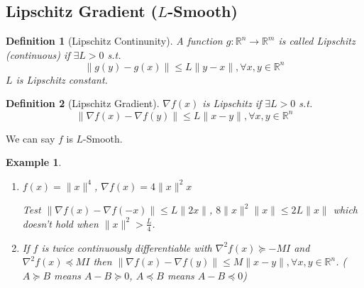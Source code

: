 \documentclass[11pt,a4paper]{article}
\newtheorem{example}{Example}
\newtheorem{definition}{Definition}
\begin{document}
\subsection{Lipschitz Gradient ($L$-Smooth)}
\begin{definition}[Lipschitz Continunity]
A function $g: \mathbb{R}^n \rightarrow	\mathbb{R}^m$ is called Lipschitz (continuous) if $\exists L>0$ s.t.
$$\|g(y)-g(x)\|\leq L\|y-x\|,\forall x,y\in \mathbb{R}^n$$
$L$ is Lipschitz constant.
\end{definition}

\begin{definition}[Lipschitz Gradient]
    $\nabla f(x)$ is Lipschitz if $\exists L>0$ s.t. $$\|\nabla f(x)-\nabla f(y)\|\leq L\|x-y\|,\forall x,y\in \mathbb{R}^n$$
\end{definition}
We can say $f$ is $L$-Smooth.

\begin{example}
    \quad

\begin{enumerate}
    \item $f(x)=\|x\|^4$, $\nabla f(x)=4\|x\|^2x$
    
    Test $\|\nabla f(x)-\nabla f(-x)\|\leq L\|2x\|$, $8\|x\|^2\|x\|\leq 2L\|x\|$ which doesn't hold when $\|x\|^2>\frac{L}{4}$.
    \item If $f$ is twice continuously differentiable with $\nabla^2 f(x)\succeq -MI$ and $\nabla^2 f(x)\preceq  MI$ then $\|\nabla f(x)-\nabla f(y)\|\leq M\|x-y\|,\forall x,y\in \mathbb{R}^n$. ($A\succeq B$ means $A-B\succeq 0$, $A\preceq B$ means $A-B\preceq 0$)
\end{enumerate}
\end{example}
\end{document}
